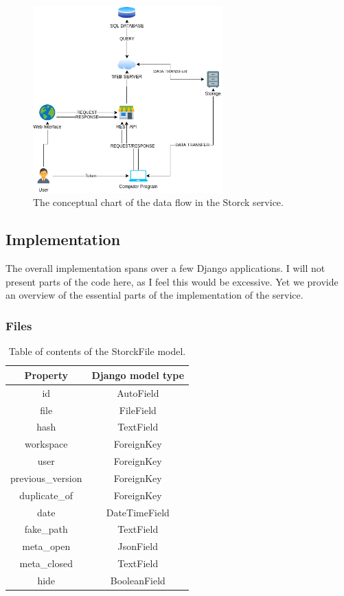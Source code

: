 \begin{figure}[H]
\centering
\includegraphics[width=0.65\textwidth]{figures/chapter5/storck/storck diagram.drawio.png}
\caption{The conceptual chart of the data flow in the Storck service.}
\label{fig:storck_diagram}
\end{figure}

\subsection{Implementation}

The overall implementation spans over a few Django applications. I will not present parts of the code here, as I feel this would be excessive.
Yet we provide an overview of the essential parts of the implementation of the service.

\subsubsection{Files}

\begin{table}[h]
\begin{center}
\begin{tabular}{ |c|c| }
\hline
Property & Django model type \\
\hline
id & AutoField \\
file & FileField \\
hash & TextField \\
workspace & ForeignKey \\
user & ForeignKey \\
previous\_version & ForeignKey \\
duplicate\_of & ForeignKey \\
date & DateTimeField \\
fake\_path & TextField \\
meta\_open & JsonField \\
meta\_closed & TextField \\
hide & BooleanField \\
\hline
\end{tabular}
\caption{\label{tab:storck_filesfield}Table of contents of the StorckFile model.}
\end{center}
\end{table}

